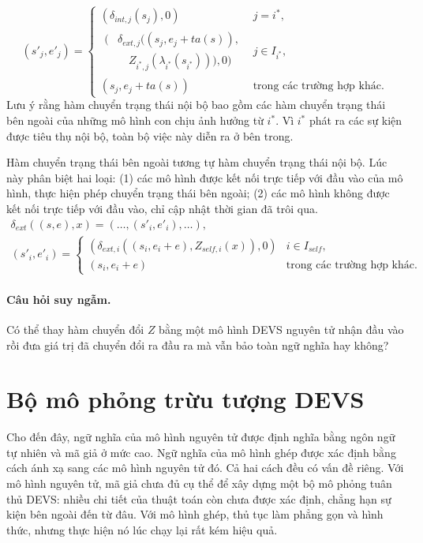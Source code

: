\[
(s'_j,e'_j)=\begin{cases}
(\delta_{int,j}(s_j),0)&j=i^*,\\
\begin{aligned}
(&\delta_{ext,j}((s_j,e_j+ta(s)),\\
&\quad Z_{i^*,j}(\lambda_{i^*}(s_{i^*}))),0)
\end{aligned}&j\in I_{i^*},\\
(s_j,e_j+ta(s))&\text{trong các trường hợp khác.}
\end{cases}
\]
Lưu ý rằng hàm chuyển trạng thái nội bộ bao gồm các hàm chuyển trạng thái bên ngoài của những mô hình con chịu ảnh hưởng từ $i^*$. Vì $i^*$ phát ra các sự kiện được tiêu thụ nội bộ, toàn bộ việc này diễn ra ở bên trong.

Hàm chuyển trạng thái bên ngoài tương tự hàm chuyển trạng thái nội bộ. Lúc này phân biệt hai loại: (1) các mô hình được kết nối trực tiếp với đầu vào của mô hình, thực hiện phép chuyển trạng thái bên ngoài; (2) các mô hình không được kết nối trực tiếp với đầu vào, chỉ cập nhật thời gian đã trôi qua.
\begin{gather*}
\delta_{ext}((s,e),x)=(\ldots,(s'_i,e'_i),\ldots),\\
(s'_i,e'_i)=\begin{cases}
(\delta_{ext,i}((s_i,e_i+e),Z_{self,i}(x)),0)&i\in I_{self},\\
(s_i,e_i+e)&\text{trong các trường hợp khác.}
\end{cases}
\end{gather*}
\paragraph{Câu hỏi suy ngẫm.} Có thể thay hàm chuyển đổi $Z$ bằng một mô hình DEVS nguyên tử nhận đầu vào rồi đưa giá trị đã chuyển đổi ra đầu ra mà vẫn bảo toàn ngữ nghĩa hay không?

\section{Bộ mô phỏng trừu tượng DEVS}
Cho đến đây, ngữ nghĩa của mô hình nguyên tử được định nghĩa bằng ngôn ngữ tự nhiên và mã giả ở mức cao. Ngữ nghĩa của mô hình ghép được xác định bằng cách ánh xạ sang các mô hình nguyên tử đó. Cả hai cách đều có vấn đề riêng. Với mô hình nguyên tử, mã giả chưa đủ cụ thể để xây dựng một bộ mô phỏng tuân thủ DEVS: nhiều chi tiết của thuật toán còn chưa được xác định, chẳng hạn sự kiện bên ngoài đến từ đâu. Với mô hình ghép, thủ tục làm phẳng gọn và hình thức, nhưng thực hiện nó lúc chạy lại rất kém hiệu quả.


